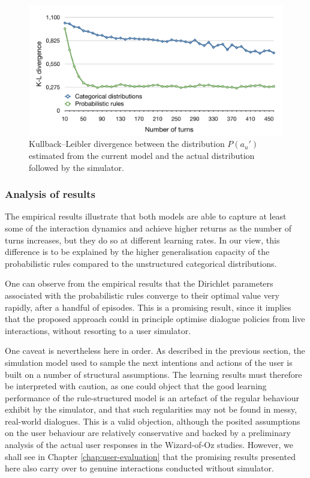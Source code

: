 \begin{figure}[p] 
\begin{center}
\includegraphics[scale=0.42]{imgs/kldivergence.pdf}
\end{center} 
\caption{Kullback--Leibler divergence between the distribution $P(a_u')$ estimated from the current model and the actual distribution followed by the simulator.}
\label{fig:divergence}
\end{figure}

\subsubsection*{Analysis of results}

The empirical results illustrate that both models are able to capture at least some of the interaction dynamics and achieve higher returns as the number of turns increases, but they do so at different learning rates.  In our view, this difference is to be explained by the higher generalisation capacity of the probabilistic rules compared to the unstructured categorical distributions.  

One can observe from the empirical results that the Dirichlet parameters associated with the probabilistic rules converge to their optimal value very rapidly, after a handful of episodes.  This is a promising result, since it implies that the proposed approach could in principle optimise dialogue policies from live interactions, without resorting to a user simulator.

One caveat is nevertheless here in order.  As described in the previous section, the simulation model used to sample the next intentions and actions of the user is built on a number of structural assumptions.  The learning results must therefore be interpreted with caution, as one could object that the good learning performance of the rule-structured model is an artefact of the regular behaviour exhibit by the simulator, and that such regularities may not be found in messy, real-world dialogues. This is a valid objection, although the posited assumptions on the user behaviour are relatively conservative and backed by a preliminary analysis of the actual user responses in the Wizard-of-Oz studies. However, we shall see in Chapter \ref{chap:user-evaluation} that the promising results presented here also carry over to genuine interactions conducted without simulator. 

